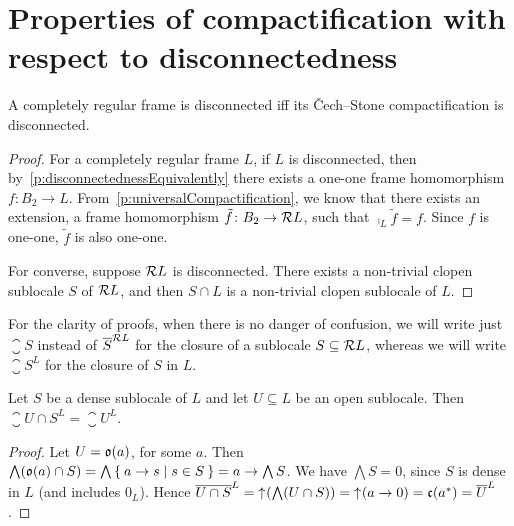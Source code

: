 \section{Properties of compactification with respect to disconnectedness}

\begin{proposition}
    A completely regular frame is disconnected iff its Čech--Stone compactification is disconnected.
\end{proposition}
\begin{proof}
    For a completely regular frame $L$, if $L$ is disconnected, then by~\ref{p:disconnectednessEquivalently} there exists a one-one frame homomorphism $f\colon B_2\to L$. From~\ref{p:universalCompactification}, we know that there exists an extension, a frame homomorphism $\tilde f\colon B_2\to \mathcal{R} L$, such that $\comp_L \tilde f = f$. Since $f$ is one-one, $\tilde f$ is also one-one.

    For converse, suppose $\mathcal{R} L$ is disconnected. There exists a non-trivial clopen sublocale $S$ of $\mathcal{R} L$, and then $S\cap L$ is a non-trivial clopen sublocale of $L$.
\end{proof}

For the clarity of proofs, when there is no danger of confusion, we will write just $\closure{S}$ instead of $\overline{S}^{\mathcal{R} L}$ for the closure of a sublocale $S\subseteq \mathcal{R} L$, whereas we will write $\closure{S}^L$ for the closure of $S$ in $L$.

\begin{lemma}\label{p:closureIntersectedByDense}
    Let $S$ be a dense sublocale of $L$ and let $U\subseteq L$ be an open sublocale. Then $\closure{U\cap S}^L = \closure{U}^L$.
\end{lemma}
\begin{proof}
    Let $U = \mathfrak{o}(a)$, for some $a$. Then $\bigwedge (\mathfrak{o}(a)\cap S) = \bigwedge \Set{ a\to s | s \in S } = a\to \bigwedge S$. We have $\bigwedge S = 0$, since $S$ is dense in $L$ (and includes $0_L$). Hence $\overline{U\cap S}^L = \mathord{\uparrow}\mkern1mu (\bigwedge (U\cap S)) = \mathord{\uparrow}\mkern1mu(a\to 0) = \mathfrak{c}(a^*) = \overline{U}^L$.
\end{proof}

